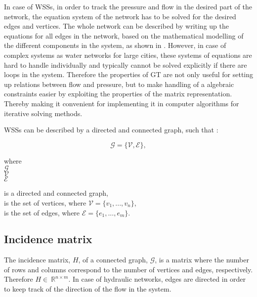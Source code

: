 In case of WSSs, in order to track the pressure and flow in the desired part of the network, the equation system of the network has to be solved for the desired edges and vertices. The whole network can be described by writing up the equations for all edges in the network, based on the mathematical modelling of the different components in the system, as shown in . However, in case of complex systems as water networks for large cities, these systems of equations are hard to handle individually and typically cannot be solved explicitly if there are loops in the system. Therefore the properties of GT are not only useful for setting up relations between flow and pressure, but to make handling of a algebraic constraints easier by exploiting the properties of the matrix representation. Thereby making it convenient for implementing it in computer algorithms for iterative solving methods.  

WSSs can be described by a directed and connected graph, such that \cite{graph_intro}: 

\begin{equation}
  \label{Numberofchords}
  \mathcal{G} = \{\mathcal{V}, \mathcal{E} \} ,
\end{equation}

\begin{minipage}[t]{0.2\textwidth}
where\\
\hspace*{8mm} $\mathcal{G} $ \\
\hspace*{8mm} $\mathcal{V} $ \\
\hspace*{8mm} $\mathcal{E} $
\end{minipage}
\begin{minipage}[t]{0.68\textwidth}
\vspace*{2mm}
is a directed and connected graph,\\
is the set of vertices, where $\mathcal{V} = \{v_1, ..., v_n\}$,\\
is the set of edges, where $\mathcal{E} = \{e_1, ..., e_m\}$. 
\end{minipage}

\subsection{Incidence matrix}
\label{incidence_matrix}

The incidence matrix, $H$, of a connected graph, $\mathcal{G}$, is a matrix where the number of rows and columns correspond to the number of vertices and edges, respectively. Therefore $H\in \: \mathbb{R}^{n \times m}$. In case of hydraulic networks, edges are directed in order to keep track of the direction of the flow in the system. 

